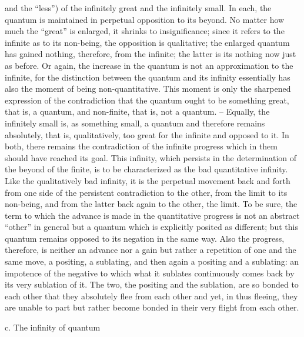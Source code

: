 and the “less”) of the infinitely great and the infinitely small. In each, the
quantum is maintained in perpetual opposition to its beyond. No matter
how much the “great” is enlarged, it shrinks to insignificance; since it refers
to the infinite as to its non-being, the opposition is qualitative; the enlarged
quantum has gained nothing, therefore, from the infinite; the latter is its
nothing now just as before. Or again, the increase in the quantum is not
an approximation to the infinite, for the distinction between the quantum
and its infinity essentially has also the moment of being non-quantitative.
This moment is only the sharpened expression of the contradiction that the
quantum ought to be something great, that is, a quantum, and non-finite,
that is, not a quantum. – Equally, the infinitely small is, as something small,
a quantum and therefore remains absolutely, that is, qualitatively, too great
for the infinite and opposed to it. In both, there remains the contradiction
of the infinite progress which in them should have reached its goal.
This infinity, which persists in the determination of the beyond of
the finite, is to be characterized as the bad quantitative infinity. Like the
qualitatively bad infinity, it is the perpetual movement back and forth from
one side of the persistent contradiction to the other, from the limit to its
non-being, and from the latter back again to the other, the limit. To be
sure, the term to which the advance is made in the quantitative progress
is not an abstract “other” in general but a quantum which is explicitly
posited as different; but this quantum remains opposed to its negation in
the same way. Also the progress, therefore, is neither an advance nor a gain
but rather a repetition of one and the same move, a positing, a sublating,
and then again a positing and a sublating: an impotence of the negative
to which what it sublates continuously comes back by its very sublation of
it. The two, the positing and the sublation, are so bonded to each other
that they absolutely flee from each other and yet, in thus fleeing, they are
unable to part but rather become bonded in their very flight from each
other.

c. The infinity of quantum

